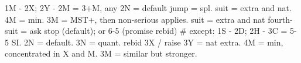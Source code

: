 1M - 2X; 2Y -
2M = 3+M, any
    2N = default
        jump = spl. suit = extra and nat. 4M = min.
        3M = MST+, then non-serious applies.
    suit = extra and nat
fourth-suit = ask stop (default); or 6-5 (promise rebid)
    # except: 1S - 2D; 2H - 3C = 5-5 SI.
2N = default. 3N = quant.
rebid 3X / raise 3Y = nat extra.
4M = min, concentrated in X and M. 3M = similar but stronger.